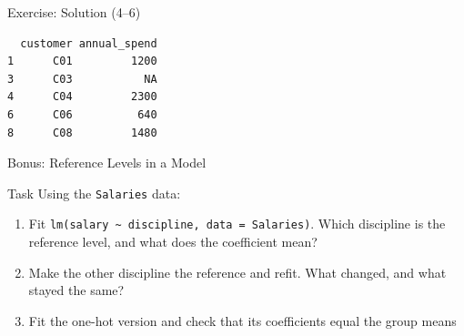 \documentclass[
  ignorenonframetext,
  aspectratio=169,
]{beamer}
\newenvironment{Shaded}{\begin{snugshade}}{\end{snugshade}}
\newcommand{\AttributeTok}[1]{\textcolor[rgb]{0.40,0.45,0.13}{#1}}
\newcommand{\CommentTok}[1]{\textcolor[rgb]{0.37,0.37,0.37}{#1}}
\newcommand{\ConstantTok}[1]{\textcolor[rgb]{0.56,0.35,0.01}{#1}}
\newcommand{\DecValTok}[1]{\textcolor[rgb]{0.68,0.00,0.00}{#1}}
\newcommand{\FunctionTok}[1]{\textcolor[rgb]{0.28,0.35,0.67}{#1}}
\newcommand{\NormalTok}[1]{\textcolor[rgb]{0.00,0.23,0.31}{#1}}
\newcommand{\OtherTok}[1]{\textcolor[rgb]{0.00,0.23,0.31}{#1}}
\newcommand{\SpecialCharTok}[1]{\textcolor[rgb]{0.37,0.37,0.37}{#1}}
\newcommand{\StringTok}[1]{\textcolor[rgb]{0.13,0.47,0.30}{#1}}
\providecommand{\tightlist}{%
  \setlength{\itemsep}{0pt}\setlength{\parskip}{0pt}}\usepackage{longtable,booktabs,array}
\begin{document}
\begin{frame}[fragile]{Exercise: Solution (4--6)}
\protect\hypertarget{exercise-solution-46}{}
\begin{Shaded}
\end{Shaded}

\begin{verbatim}
  customer annual_spend
1      C01         1200
3      C03           NA
4      C04         2300
6      C06          640
8      C08         1480
\end{verbatim}
\end{frame}

\begin{frame}[fragile]{Bonus: Reference Levels in a Model}
\protect\hypertarget{bonus-reference-levels-in-a-model}{}
\begin{alertblock}{Task}
\protect\hypertarget{task-1}{}
Using the \texttt{Salaries} data:

\begin{enumerate}
\tightlist
\item
  Fit
  \texttt{lm(salary\ \textasciitilde{}\ discipline,\ data\ =\ Salaries)}.
  Which discipline is the reference level, and what does the coefficient
  mean?
\item
  Make the other discipline the reference and refit. What changed, and
  what stayed the same?
\item
  Fit the one-hot version and check that its coefficients equal the
  group means
\end{enumerate}
\end{alertblock}
\end{frame}
\end{document}
